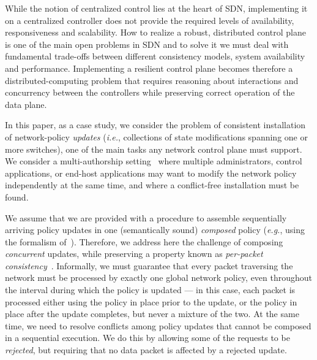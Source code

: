 \documentclass[11pt,pdftex,letter]{article}
\newcommand{\eg}{{\it e.g.}}
\newcommand{\ie}{{\it i.e.}}
\begin{document}
While the notion of centralized control lies at the heart of SDN,
implementing it on a centralized controller does not provide the required
levels of availability, responsiveness and scalability.
How to realize a robust, distributed control plane is one of the main open problems in
SDN
and to solve it we must deal with
fundamental trade-offs between
different consistency models, system availability and performance.
%
Implementing a resilient control plane becomes therefore a
distributed-computing problem that requires reasoning about
interactions and concurrency between the controllers while preserving
correct operation of the data plane.

In this paper, as a case study, we consider the problem of consistent
installation of network-policy \emph{updates} (\ie, collections of
state modifications spanning one or more switches),
one of the main tasks any network control
plane must support.
We consider a multi-authorship setting~\cite{Ferguson2013} where multiple
administrators, control applications, or end-host
applications may want to modify the network policy
independently at the same time, and where a conflict-free installation must be
found.

We assume that we are provided with a procedure
to assemble sequentially arriving policy updates in one  (semantically
sound) \emph{composed} policy (\eg, using the formalism of~\cite{netkat}).
Therefore, we address here the challenge of composing
\emph{concurrent} updates, while preserving a property known
as \emph{per-packet consistency}~\cite{network-update}.
Informally, we must guarantee that every packet traversing the network must be processed by
exactly one global network policy, even
throughout the interval during which the policy is updated --- in this case,
each packet is processed either using the policy in place prior to the update,
or the policy in place after the update completes, but never a mixture of the
two.
At the same time, we need to resolve conflicts among policy updates that
cannot be composed in a sequential execution. We do this by allowing
some of the requests to be \emph{rejected}, but requiring that
no data packet is affected by a rejected update.
\end{document}
